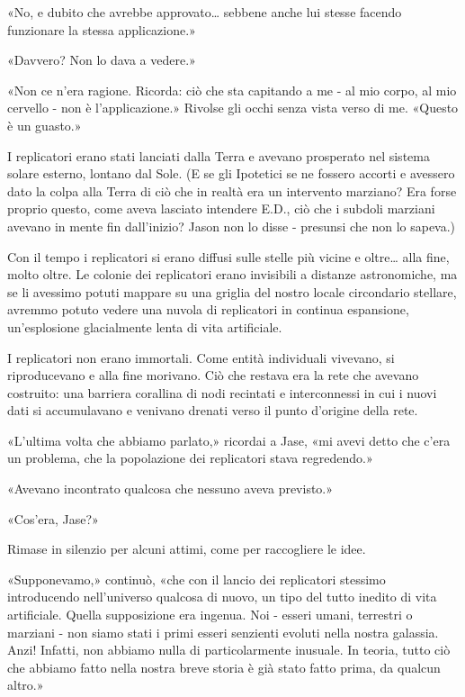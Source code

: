 «No, e dubito che avrebbe approvato\ldots{} sebbene anche lui stesse
facendo funzionare la stessa applicazione.»

«Davvero? Non lo dava a vedere.»

«Non ce n'era ragione. Ricorda: ciò che sta capitando a me - al mio
corpo, al mio cervello - non è l'applicazione.» Rivolse gli occhi senza
vista verso di me. «Questo è un guasto.»

\separatorefiori

I replicatori erano stati lanciati dalla Terra e avevano prosperato nel
sistema solare esterno, lontano dal Sole. (E se gli Ipotetici se ne
fossero accorti e avessero dato la colpa alla Terra di ciò che in realtà
era un intervento marziano? Era forse proprio questo, come aveva
lasciato intendere E.D., ciò che i subdoli marziani avevano in mente fin
dall'inizio? Jason non lo disse - presunsi che non lo sapeva.)

Con il tempo i replicatori si erano diffusi sulle stelle più vicine e
oltre\ldots{} alla fine, molto oltre. Le colonie dei replicatori erano
invisibili a distanze astronomiche, ma se li avessimo potuti mappare su
una griglia del nostro locale circondario stellare, avremmo potuto
vedere una nuvola di replicatori in continua espansione, un'esplosione
glacialmente lenta di vita artificiale.

I replicatori non erano immortali. Come entità individuali vivevano, si
riproducevano e alla fine morivano. Ciò che restava era la rete che
avevano costruito: una barriera corallina di nodi recintati e
interconnessi in cui i nuovi dati si accumulavano e venivano drenati
verso il punto d'origine della rete.

«L'ultima volta che abbiamo parlato,» ricordai a Jase, «mi avevi detto
che c'era un problema, che la popolazione dei replicatori stava
regredendo.»

«Avevano incontrato qualcosa che nessuno aveva previsto.»

«Cos'era, Jase?»

Rimase in silenzio per alcuni attimi, come per raccogliere le idee.

«Supponevamo,» continuò, «che con il lancio dei replicatori stessimo
introducendo nell'universo qualcosa di nuovo, un tipo del tutto inedito
di vita artificiale. Quella supposizione era ingenua. Noi - esseri
umani, terrestri o marziani - non siamo stati i primi esseri senzienti
evoluti nella nostra galassia. Anzi! Infatti, non abbiamo nulla di
particolarmente inusuale. In teoria, tutto ciò che abbiamo fatto nella
nostra breve storia è già stato fatto prima, da qualcun altro.»


